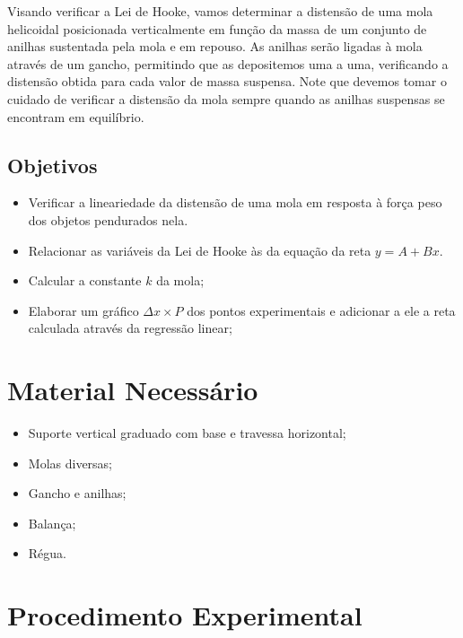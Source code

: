 Visando verificar a Lei de Hooke, vamos determinar a distensão de uma mola helicoidal posicionada verticalmente em função da massa de um conjunto de anilhas sustentada pela mola e em repouso. As anilhas serão ligadas à mola através de um gancho, permitindo que as depositemos uma a uma, verificando a distensão obtida para cada valor de massa suspensa. Note que devemos tomar o cuidado de verificar a distensão da mola sempre quando as anilhas suspensas se encontram em equilíbrio.

\subsection{Objetivos}

\begin{itemize}
     \item Verificar a lineariedade da distensão de uma mola em resposta à força peso dos objetos pendurados nela.
	 \item Relacionar as variáveis da Lei de Hooke às da equação da reta $y = A + Bx$.
     \item Calcular a constante $k$ da mola;
     \item Elaborar um gráfico $\Delta x \times P$ dos pontos experimentais e adicionar a ele a reta calculada através da regressão linear;
\end{itemize}

\section{Material Necessário}

\begin{itemize}
	\item Suporte vertical graduado com base e travessa horizontal;
	\item Molas diversas;
	\item Gancho e anilhas;
	\item Balança;
	\item Régua.
\end{itemize}

\section{Procedimento Experimental}

